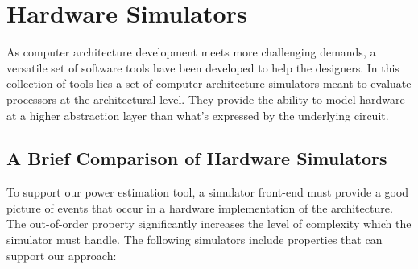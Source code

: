 \section{Hardware Simulators}

As computer architecture development meets more challenging demands, a versatile
set of software tools have been developed to help the designers. In this
collection of tools lies a set of computer architecture simulators meant to
evaluate processors at the architectural level. They provide the ability to
model hardware at a higher abstraction layer than what's expressed by the
underlying circuit.

\subsection{A Brief Comparison of Hardware Simulators}
\label{subsec:simulators}
To support our power estimation tool, a simulator front-end must provide a good
picture of events that occur in a hardware implementation of the architecture.
The out-of-order property significantly increases the level of complexity which
the simulator must handle. The following simulators include properties that can
support our approach:

